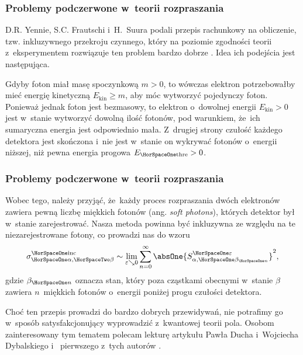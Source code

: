 \documentclass[10pt,t]{beamer}
\begin{document}
\begin{frame}
  \frametitle{Problemy podczerwone w~teorii rozpraszania}


  D.R. Yennie, S.C. Frautschi i~H.~Suura podali przepis rachunkowy na
  obliczenie, tzw. inkluzywnego przekroju czynnego, który na poziomie
  zgodności teorii z~eksperymentem rozwiązuje ten problem bardzo dobrze
  \parencite{Yennie-Frautschi-Suura-The-infrared-divergence-ETC-Pub-1961}.
  Idea ich podejścia jest następująca.

  Gdyby foton miał masę spoczynkową $m > 0$, to wówczas elektron
  potrzebowałby mieć energię kinetyczną $E_{ \text{kin} } \geq m$, aby móc
  wytworzyć pojedynczy foton. Ponieważ jednak foton jest bezmasowy, to
  elektron o~dowolnej energii $E_{ \text{kin} } > 0$ jest w~stanie
  wytworzyć \alert{dowolną} ilość fotonów, pod warunkiem, że~ich sumaryczna
  energia jest odpowiednio mała. Z~drugiej strony czułość każdego detektora
  jest skończona i~nie jest w~stanie on wykrywać fotonów o~energii niższej,
  niż pewna energia progowa $E_{ \HorSpaceOne \text{thre} } > 0$.

\end{frame}





\begin{frame}
  \frametitle{Problemy podczerwone w~teorii rozpraszania}


  Wobec tego, należy przyjąć, że~każdy proces rozpraszania dwóch elektronów
  zawiera pewną liczbę miękkich fotonów (ang. \textit{soft photons}),
  których detektor był w~stanie zarejestrować. Nasza metoda powinna być
  inkluzywna ze względu na te niezarejestrowane fotony, co prowadzi nas do
  wzoru
  \begin{equation}
    \label{eq:Efekt-Casimira-01}
    \sigma_{ \HorSpaceOne \alpha, \HorSpaceTwo \beta }^{ \HorSpaceOne \text{inc} } \sim
    \lim_{ \varepsilon \searrow 0 } \sum_{ n = 0 }^{ \infty }
    \absOne{ S_{ \alpha, \HorSpaceOne \beta_{ \HorSpaceOne n } }^{ \HorSpaceOne \varepsilon } }^{ 2 },
  \end{equation}
  gdzie $\beta_{ \HorSpaceOne n }$ oznacza stan, który poza cząstkami obecnymi
  w~stanie $\beta$ zawiera $n$~miękkich fotonów o~energii poniżej progu
  czułości detektora.

  Choć ten przepis prowadzi do bardzo dobrych przewidywań, nie potrafimy
  go w~sposób satysfakcjonujący wyprowadzić z~kwantowej teorii pola.
  Osobom zainteresowany tym tematem polecam lekturę artykułu Pawła Ducha
  i~Wojciecha Dybalskiego 
  \parencite{Duch-Dybalski-Infrared-problem-in-quantum-electrodynamics-Pub-2023}
  i~
  pierwszego z~tych autorów
  \parencite{Duch-Infrared-problem-in-perturbative-quantum-ETC-Pub-2021}.

\end{frame}
\end{document}
